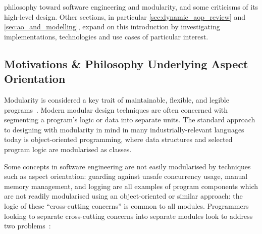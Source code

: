 


philosophy toward software engineering and modularity, and some criticisms of
its high-level design. Other sections, in particular
\cref{sec:dynamic_aop_review} and \cref{sec:ao_and_modelling}, expand on this
introduction by investigating implementations, technologies and use cases of
particular interest.

\subsection{Motivations \& Philosophy Underlying Aspect Orientation}
\label{review_aop_motivations_and_philosophy}

Modularity is considered a key trait of maintainable, flexible, and legible
programs~\cite{parnas_1972}. Modern modular design techniques are often
concerned with segmenting a program's logic or data into separate units. The
standard approach to designing with modularity in mind in many
industrially-relevant languages today is object-oriented programming, where
data structures and selected program logic are modularised as
classes.

Some concepts in software engineering are not easily modularised by techniques
such as aspect orientation: guarding against unsafe concurrency usage, manual
memory management, and logging are all examples of program components which are
not readily modularised using an object-oriented or similar approach: the logic
of these ``cross-cutting concerns'' is common to all modules. Programmers
looking to separate cross-cutting concerns into separate modules look to
address two problems~\cite{kiczales1997aspect}:

